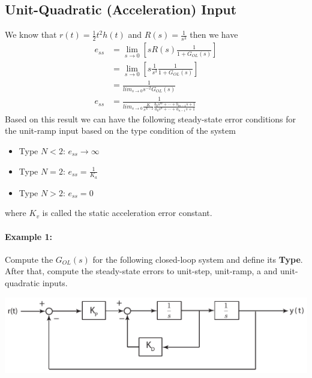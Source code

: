 \documentclass[twoside]{article}
\begin{document}
\subsection*{Unit-Quadratic (Acceleration) Input}
%
We know that $r(t) = \frac{1}{2} t^2 h(t)$ and $R(s) = \frac{1}{s^3}$ then
we have
\begin{align*}
e_{ss} &= \lim_{s \to 0} \left[ s R(s) \frac{1}{1
         + G_{OL} (s) } \right]
\\
&= \lim_{s \to 0} \left[ s \frac{1}{s^3} \frac{1}{1
         + G_{OL} (s) } \right]
\\
 &= \frac{1}{lim_{s \to 0} s^{-2} G_{OL} (s) }
\\
e_{ss} &= \frac{1}{lim_{s \to 0} \frac{K}{s^{N-2}} \frac{b_0 s^m + \cdots + b_{m-1} s + 1}{a_0 s^n + \cdots + a_{n-1} s + 1} }
\end{align*}
%
Based on this result we can have the following steady-state
error conditions for the unit-ramp input based on the type 
condition of the system
%
\begin{itemize}
\item Type $N < 2$: $e_{ss} \to  \infty$
\item Type $N = 2$: $e_{ss} = \frac{1}{K_{a}}$
\item Type $N > 2$: $e_{ss} = 0$
\end{itemize}
%
where $K_v$ is called the static acceleration error constant.

\paragraph{Example 1:} Compute the $G_{OL}(s)$ for the following closed-loop
system and define its \textbf{Type}. After that, compute the steady-state errors to unit-step, unit-ramp, a
and unit-quadratic inputs.

\begin{center}
\begin{minipage}[h]{0.75\linewidth}
    \begin{center}
      \includegraphics[width=\textwidth]{example}
    \end{center}
\end{minipage}
\end{center}
\end{document}
